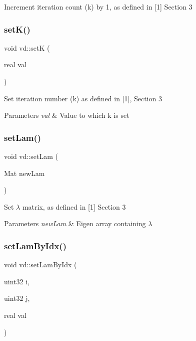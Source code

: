 Increment iteration count (k) by 1, as defined in \mbox{[}1\mbox{]} Section 3 \mbox{\label{classvd_a7c692a97b49c4596c4ec1bc0a129b516}} 
\subsubsection{\texorpdfstring{set\+K()}{setK()}}
{\footnotesize\ttfamily void vd\+::setK (\begin{DoxyParamCaption}\item[{real}]{val }\end{DoxyParamCaption})}

Set iteration number (k) as defined in \mbox{[}1\mbox{]}, Section 3 
\begin{DoxyParams}{Parameters}
{\em val} & Value to which k is set \\
\hline
\end{DoxyParams}
\mbox{\label{classvd_ae13e9e465d08425218bd8f85ce420c05}} 
\subsubsection{\texorpdfstring{set\+Lam()}{setLam()}}
{\footnotesize\ttfamily void vd\+::set\+Lam (\begin{DoxyParamCaption}\item[{Mat}]{new\+Lam }\end{DoxyParamCaption})}

Set $ \lambda $ matrix, as defined in \mbox{[}1\mbox{]} Section 3 
\begin{DoxyParams}{Parameters}
{\em new\+Lam} & Eigen array containing $ \lambda $ \\
\hline
\end{DoxyParams}
\mbox{\label{classvd_a8df228a05762e0c0a2bccc28094a1f92}} 
\subsubsection{\texorpdfstring{set\+Lam\+By\+Idx()}{setLamByIdx()}}
{\footnotesize\ttfamily void vd\+::set\+Lam\+By\+Idx (\begin{DoxyParamCaption}\item[{uint32}]{i,  }\item[{uint32}]{j,  }\item[{real}]{val }\end{DoxyParamCaption})}

